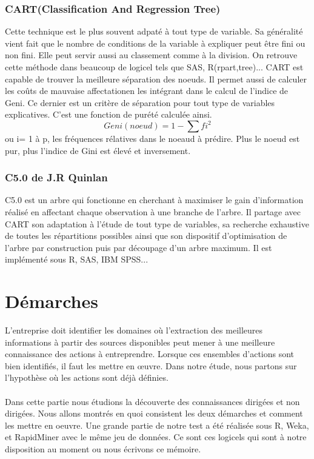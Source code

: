 \documentclass[11pt,a4paper]{report}
\begin{document}
\subsubsection{CART(Classification And Regression Tree)}
Cette technique est le plus souvent adpaté à tout type de variable.
Sa généralité vient fait que le nombre de conditions de la variable à expliquer peut être fini ou non fini. Elle peut servir aussi au classement comme à la division. On retrouve cette méthode dans beaucoup de logicel tels que SAS, R(rpart,tree)...
CART est capable de trouver la meilleure séparation des noeuds. Il permet aussi de calculer les coûts de mauvaise affectationen les intégrant dans le calcul de l'indice de Geni. Ce dernier est un critère de séparation pour tout type de variables explicatives. C'est une fonction de purété calculée ainsi. 
\begin{equation}
  Geni(noeud)=1-\sum fi^2 
\end{equation}
ou i= 1 à p, les fréquences rélatives dans le noeaud à prédire. Plus le noeud est pur, plus l'indice de Gini est élevé et inversement. 

\subsubsection{C5.0 de J.R Quinlan}
C5.0 est un arbre qui fonctionne en cherchant à maximiser le gain d'information réalisé en affectant chaque observation à une branche de l'arbre. Il partage avec CART son adaptation à l'étude de tout type de variables, sa recherche exhaustive de toutes les répartitions possibles ainsi que son dispositif d'optimisation de l'arbre par construction puis par découpage d'un arbre maximum. Il est implémenté sous R, SAS, IBM SPSS... 
 
\newpage

\section{Démarches}
L’entreprise doit identifier les domaines où l’extraction des meilleures informations à partir des sources disponibles peut mener à une meilleure connaissance des actions à entreprendre. Lorsque ces ensembles d’actions sont bien identifiés, il faut les mettre en œuvre. Dans notre étude, nous partons sur l’hypothèse où les actions sont déjà définies.\\\\
Dans cette partie nous étudions la découverte des connaissances dirigées et non dirigées. Nous allons montrés en quoi consistent les deux démarches et comment les mettre en oeuvre. Une grande partie de notre test a été réalisée sous R, Weka, et RapidMiner avec le même jeu de données. 
Ce sont ces logicels qui sont à notre disposition au moment ou nous écrivons ce mémoire. 
\end{document}
